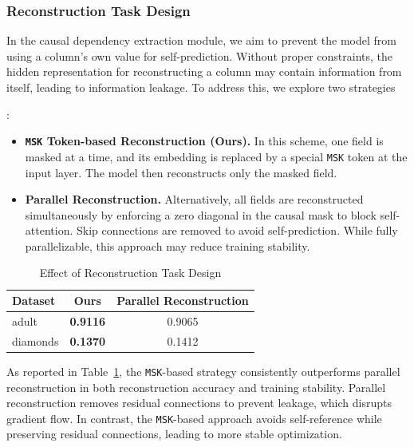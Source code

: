 \documentclass[sigconf, nonacm]{acmart}
\newcommand{\rlend}[1]{{\color{black}#1}}
\newcommand{\syend}[1]{{\color{black}#1}}
\newcommand{\syadd}[1]{{\color{black}#1}}
\newcommand{\syne}[1]{{\color{black}#1}}
\begin{document}
\subsubsection{Reconstruction Task Design}
\rlend{
In the causal dependency extraction module, we aim to prevent the model from using a column's own value for self-prediction. Without proper constraints, the hidden representation for reconstructing a column may contain information from itself, leading to information leakage. To address this, we explore two strategies}\syadd{: 
\begin{itemize}
    \item \textbf{\texttt{MSK} Token-based Reconstruction (Ours).}  
    In this scheme, one field is masked at a time, and its embedding is replaced by a special \texttt{MSK} token at the input layer. The model then reconstructs only the masked field.

    \item \textbf{Parallel Reconstruction.}  
    Alternatively, all fields are reconstructed simultaneously by enforcing a zero diagonal in the causal mask to block self-attention. Skip connections are removed to avoid self-prediction. While fully parallelizable, this approach may reduce training stability.
\end{itemize}
}

\begin{table}[h]
    \centering
    \small
    \caption{Effect of Reconstruction Task Design}
    \label{tab:reconstruction_comparison}
    \begin{tabular}{lcc}
        \toprule
        Dataset & Ours & Parallel Reconstruction \\
        \midrule
        adult   & \syne{\textbf{0.9116}} & \syne{0.9065} \\
        diamonds & \syne{\textbf{0.1370}} & \syne{0.1412} \\
        \bottomrule
    \end{tabular}
\end{table}

\syadd{As reported in Table~\ref{tab:reconstruction_comparison}, the \texttt{MSK}-based strategy consistently outperforms parallel reconstruction in both reconstruction accuracy and training stability.} \rlend{Parallel reconstruction removes residual connections to \syend{prevent} leakage, which disrupts gradient flow. In contrast, the \texttt{MSK}-based approach \syend{avoids} self-reference while preserving residual connections, leading to more stable optimization.
}
\end{document}
